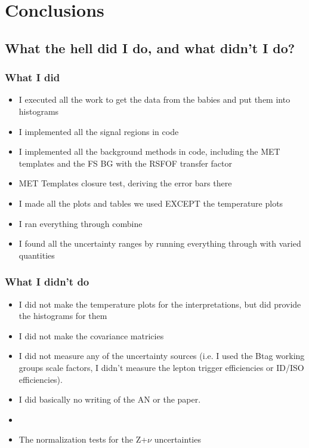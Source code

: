 \chapter{Conclusions}

\section{What the hell did I do, and what didn't I do?}

\subsection{What I did}
\begin{itemize}
  \item I executed all the work to get the data from the babies and put them into histograms
  \item I implemented all the signal regions in code
  \item I implemented all the background methods in code, including the MET templates and the FS BG with the RSFOF transfer factor
  \item MET Templates closure test, deriving the error bars there 
  \item I made all the plots and tables we used EXCEPT the temperature plots
  \item I ran everything through combine
  \item I found all the uncertainty ranges by running everything through with varied quantities
\end{itemize}

\subsection{What I didn't do}
\begin{itemize}
  \item I did not make the temperature plots for the interpretations, but did provide the histograms for them
  \item I did not make the covariance matricies
  \item I did not measure any of the uncertainty sources (i.e. I used the Btag working groups scale factors, I didn't measure the lepton trigger efficiencies or ID/ISO efficiencies).
  \item I did basically no writing of the AN or the paper.
  \item \rsfof
  \item The normalization tests for the Z+$\nu$ uncertainties
\end{itemize}
